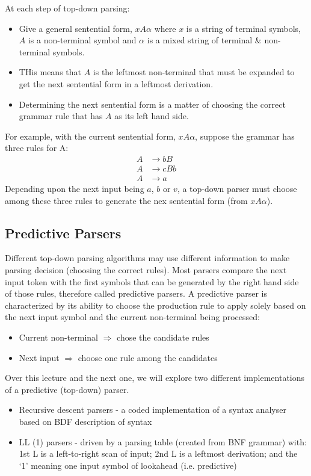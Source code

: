 At each step of top-down parsing:
\begin{itemize}
    \item Give a general sentential form, $xA\alpha$ where $x$ is a string of terminal symbols, $A$ is a non-terminal symbol and $\alpha$ is a mixed string of terminal \& non-terminal symbols. 
    \item THis means that $A$ is the leftmost non-terminal that must be expanded to get the next sentential form in a leftmost derivation. 
    \item Determining the next sentential form is a matter of choosing the correct grammar rule that has $A$ as its left hand side. 
\end{itemize}
For example, with the current sentential form, $xA\alpha$, suppose the grammar has three rules for A:
\begin{align*}
    A & \rightarrow bB\\
    A & \rightarrow cBb\\
    A & \rightarrow a
\end{align*}
Depending upon the next input being $a$, $b$ or $v$, a top-down parser must choose among these three rules to generate the nex sentential form (from $xA\alpha$). 

\subsection*{Predictive Parsers}
Different top-down parsing algorithms may use different information to make parsing decision (choosing the correct rules). Most parsers compare the next input token with the first symbols that can be generated by the right hand side of those rules, therefore called predictive parsers. A predictive parser is characterized by its ability to choose the production rule to apply solely based on the next input symbol and the current non-terminal being processed:
\begin{itemize}
    \item Current non-terminal $\Rightarrow$ chose the candidate rules
    \item Next input $\Rightarrow$ choose one rule among the candidates
\end{itemize}
Over this lecture and the next one, we will explore two different implementations of a predictive (top-down) parser.
\begin{itemize}
    \item Recursive descent parsers - a coded implementation of a syntax analyser based on BDF description of syntax
    \item LL (1) parsers - driven by a parsing table (created from BNF grammar) with: 1st L is a left-to-right scan of input; 2nd L is a leftmost derivation; and the `1' meaning one input symbol of lookahead (i.e. predictive)
\end{itemize}

